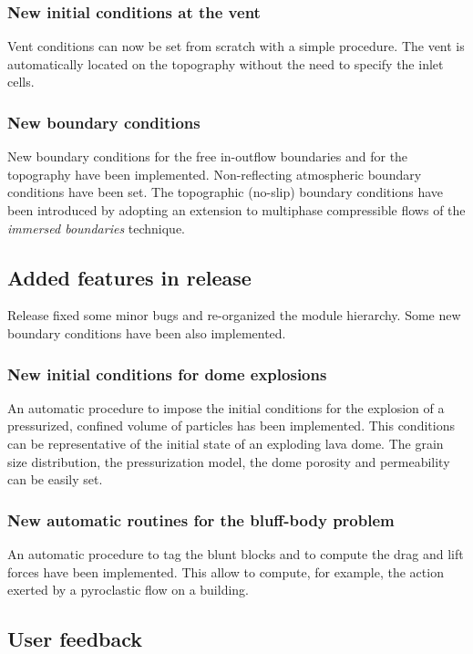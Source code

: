 \subsubsection*{New initial conditions at the vent}
Vent conditions can now be set from scratch with a simple procedure.
The vent is automatically located on the topography without the need
to specify the inlet cells.

\subsubsection*{New boundary conditions}
New boundary conditions for the free in-outflow boundaries
and for the topography have been implemented. 
Non-reflecting atmospheric boundary conditions have been set.
The topographic (no-slip) boundary
conditions have been introduced by adopting an extension to multiphase
compressible flows of the {\em immersed boundaries} technique.

\subsection{Added features in release \RELEASEVERSION}

Release \RELEASEVERSION fixed some minor bugs and re-organized
the module hierarchy. Some new boundary conditions have been
also implemented.

\subsubsection*{New initial conditions for dome explosions}
An automatic procedure to impose the initial conditions for the
explosion of a pressurized, confined volume of particles has been
implemented. This conditions can be representative of the initial
state of an exploding lava dome. The grain size distribution, 
the pressurization model, the dome porosity and permeability can
be easily set.

\subsubsection*{New automatic routines for the bluff-body problem}
An automatic procedure to tag the blunt blocks and to compute the
drag and lift forces have been implemented. This allow to compute,
for example, the action exerted by a pyroclastic flow on a building.

\subsection{User feedback}

